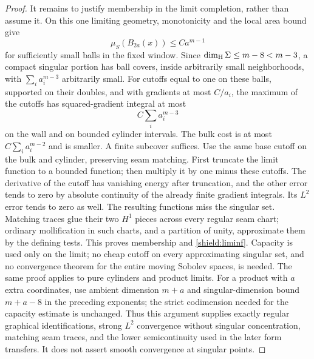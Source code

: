 \begin{proof}
It remains to justify membership in the limit completion, rather than
assume it.  On this one limiting geometry, monotonicity and the local
area bound give
\[
 \mu_S(B_{2a}(x))\le C a^{m-1}
\]
for sufficiently small balls in the fixed window.  Since
$\dim_{\rm H}\Sigma\le m-8<m-3$, a compact singular portion has ball
covers, inside arbitrarily small neighborhoods, with
$\sum_i a_i^{m-3}$ arbitrarily small.  For cutoffs equal to one on these
balls, supported on their doubles, and with gradients at most $C/a_i$,
the maximum of the cutoffs has squared-gradient integral at most
\[
 C\sum_i a_i^{m-3}
\]
on the wall and on bounded cylinder intervals.  The bulk cost is at
most $C\sum_i a_i^{m-2}$ and is smaller.  A finite subcover suffices.
Use the same base cutoff on the bulk and cylinder, preserving seam
matching.  First truncate the limit function to a bounded function;
then multiply it by one minus these cutoffs.  The derivative of the
cutoff has vanishing energy after truncation, and the other error tends
to zero by absolute continuity of the already finite gradient
integrals.  Its $L^2$ error tends to zero as well.  The resulting functions
miss the singular set.  Matching traces glue their two $H^1$ pieces
across every regular seam chart; ordinary mollification in such charts,
and a partition of unity, approximate them by the defining tests.
This proves membership and \cref{shield:liminf}.  Capacity is used only
on the limit; no cheap cutoff on every approximating singular set, and
no convergence theorem for the entire moving Sobolev spaces, is needed.
The same proof applies to pure cylinders and product limits.
For a product with $a$ extra coordinates, use ambient dimension $m+a$
and singular-dimension bound $m+a-8$ in the preceding exponents;
the strict codimension needed for the capacity estimate is unchanged.
Thus this argument supplies exactly regular graphical identifications,
strong $L^2$ convergence without singular concentration, matching seam
traces, and the lower semicontinuity used in the later form transfers.
It does not assert smooth convergence at singular points.
\end{proof}


